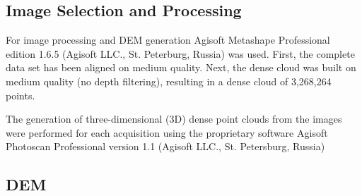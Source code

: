 \documentclass{isprs} %
\begin{document}
\subsection{Image Selection and Processing}
For image processing and DEM generation Agisoft Metashape Professional edition 1.6.5 (Agisoft LLC., St. Peterburg, Russia) was used.
First, the complete data set has been aligned on medium quality.
Next, the dense cloud was built on medium quality (no depth filtering), resulting in a dense cloud of 3,268,264 points.



The generation of three-dimensional (3D) dense point clouds from the images were performed for each acquisition using the proprietary software Agisoft Photoscan Professional version 1.1 (Agisoft LLC., St. Petersburg, Russia)

\subsection{DEM}

\sloppy




{
	\begin{spacing}{1.17}
		\normalsize
	\end{spacing}
}



\vspace{1cm}
\end{document}
